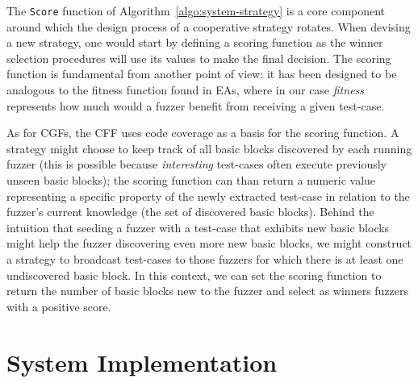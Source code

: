The \texttt{Score} function of Algorithm~\ref{algo:system-strategy} is a core
component around which the design process of a cooperative strategy rotates.
When devising a new strategy, one would start by defining a scoring function as
the winner selection procedures will use its values to make the final decision.
The scoring function is fundamental from another point of view: it has been
designed to be analogous to the fitness function found in \acp{EA}, where in our
case \emph{fitness} represents how much would a fuzzer benefit from receiving a
given test-case.

As for \acp{CGF}, the \ac{CFF} uses code coverage as a basis for the scoring
function. A strategy might choose to keep track of all basic blocks discovered
by each running fuzzer (this is possible because \emph{interesting} test-cases
often execute previously unseen basic blocks); the scoring function can than
return a numeric value representing a specific property of the newly extracted
test-case in relation to the fuzzer's current knowledge (the set of discovered
basic blocks). Behind the intuition that seeding a fuzzer with a test-case that
exhibits new basic blocks might help the fuzzer discovering even more new basic
blocks, we might construct a strategy to broadcast test-cases to those fuzzers
for which there is at least one undiscovered basic block. In this context, we
can set the scoring function to return the number of basic blocks new to the
fuzzer and select as winners fuzzers with a positive score. %


\section{System Implementation}

